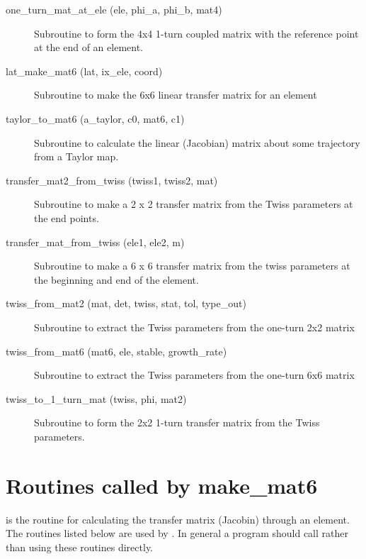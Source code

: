 \begin{description}
\item[one_turn_mat_at_ele (ele, phi_a, phi_b, mat4)] \Newline
Subroutine to form the 4x4 1-turn coupled matrix with the reference point 
at the end of an element. 

\item[lat_make_mat6 (lat, ix_ele, coord)] \Newline
Subroutine to make the 6x6 linear transfer matrix for an element 

\item[taylor_to_mat6 (a_taylor, c0, mat6, c1)] \Newline
Subroutine to calculate the linear (Jacobian) matrix about some trajectory from a Taylor map. 

\item[transfer_mat2_from_twiss (twiss1, twiss2, mat)] \Newline
Subroutine to make a 2 x 2 transfer matrix from the Twiss parameters at the end points. 

\item[transfer_mat_from_twiss (ele1, ele2, m)] \Newline 
Subroutine to make a 6 x 6 transfer matrix from the twiss parameters
at the beginning and end of the element.

\item[twiss_from_mat2 (mat, det, twiss, stat, tol, type_out)] \Newline
Subroutine to extract the Twiss parameters from the one-turn 2x2 matrix 

\item[twiss_from_mat6 (mat6, ele, stable, growth_rate)] \Newline
Subroutine to extract the Twiss parameters from the one-turn 6x6 matrix 

\item[twiss_to_1_turn_mat (twiss, phi, mat2)] \Newline
Subroutine to form the 2x2 1-turn transfer matrix from the Twiss parameters. 

\end{description}

\section{Routines called by make_mat6}
\label{r:mat6}
 
 is the routine for calculating the transfer matrix (Jacobin)
through an element. The routines listed below are used by .
In general a program should call  rather than using these
routines directly.

